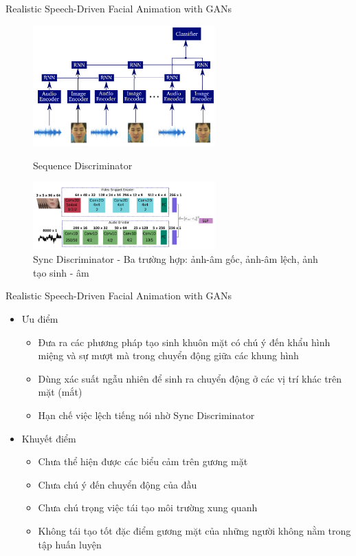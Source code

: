 \begin{frame}{Realistic Speech-Driven Facial Animation with GANs}
    \begin{figure}[H]
        \centering
        \begin{minipage}{0.48\textwidth}
            \includegraphics[width=7cm]{./images/vou2019_seq_dis.png}
            \caption{Sequence Discriminator}
            \label{fig:vou2020_generator}
        \end{minipage}\hfill
        \begin{minipage}{0.48\textwidth}
            \includegraphics[width=7cm]{./images/vou2020_sync_dis.png}
            \caption{Sync Discriminator - Ba trường hợp: ảnh-âm gốc, ảnh-âm lệch, ảnh tạo sinh - âm}
            \label{fig:vou2020_model}
        \end{minipage}
    \end{figure}
\end{frame}

\begin{frame}{Realistic Speech-Driven Facial Animation with GANs}
    \begin{itemize}
        \item Ưu điểm
        \begin{itemize}
            \item Đưa ra các phương pháp tạo sinh khuôn mặt có chú ý đến khẩu hình miệng và sự mượt mà trong chuyển động giữa các khung hình
            \item Dùng xác suất ngẫu nhiên để sinh ra chuyển động ở các vị trí khác trên mặt (mắt)
            \item Hạn chế việc lệch tiếng nói nhờ Sync Discriminator
        \end{itemize}
        \item Khuyết điểm
        \begin{itemize}
            \item Chưa thể hiện được các biểu cảm trên gương mặt
            \item Chưa chú ý đến chuyển động của đầu
            \item Chưa chú trọng việc tái tạo môi trường xung quanh
            \item Không tái tạo tốt đặc điểm gương mặt của những người không nằm trong tập huấn luyện
        \end{itemize}
    \end{itemize}
\end{frame}
